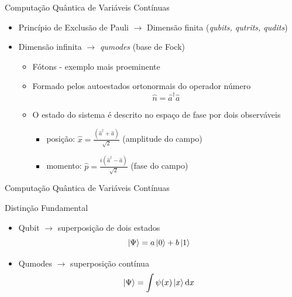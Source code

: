 \documentclass[xcolor={dvipsnames,table}]{beamer}
\begin{document}
\begin{frame}{Computação Quântica de Variáveis Contínuas}
    
    \begin{itemize}
        \item Princípio de Exclusão de Pauli $\rightarrow$ Dimensão finita (\textit{qubits, qutrits, qudits})
        \item Dimensão infinita $\rightarrow$ \textit{qumodes} (base de Fock)
        \begin{itemize}
            \item Fótons - exemplo mais proeminente
            \item Formado pelos autoestados ortonormais do operador número $$\hat{n}=\hat{a}^\dagger \hat{a}$$
            \item O estado do sistema é descrito no espaço de fase por dois observáveis
            \begin{itemize}
                \item posição: $\hat{x}=\displaystyle\frac{(\hat{a}^\dagger+\hat{a})}{\sqrt{2}}$  (amplitude do campo)
                \item momento: $\hat{p}=\displaystyle\frac{i(\hat{a}^\dagger-\hat{a})}{\sqrt{2}}$  (fase do campo)
            \end{itemize}
        \end{itemize}
    \end{itemize}
\end{frame}

\begin{frame}{Computação Quântica de Variáveis Contínuas}

    \begin{block}{Distinção Fundamental}
        \begin{itemize}
            \item Qubit $\rightarrow$ superposição de dois estados
            $$\ket{\Psi}=a\ket{0}+b\ket{1}$$
            \item Qumodes $\rightarrow$ superposição contínua
            $$\ket{\Psi}=\int\psi(x)\ket{x}\text{d}x$$
        \end{itemize}
    \end{block}
\end{frame}
\end{document}

